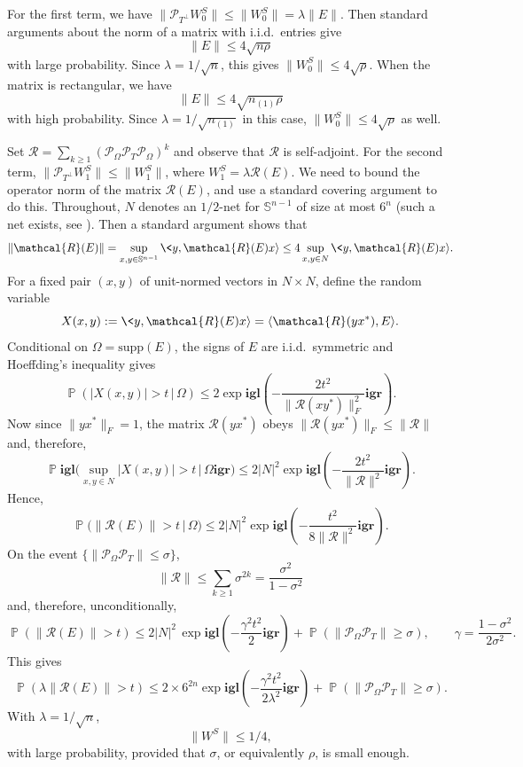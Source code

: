 For the first term, we have $\|\mathcal{P}_{T^\perp} W_0^S\| \le \|W_0^S\| = \lambda
\|E\|$. Then standard arguments about the norm of a matrix with i.i.d.~entries give \cite{Vershynin280}
\[
\|E\| \le 4\sqrt{n \rho}
\]
with large probability.  Since $\lambda = 1/\sqrt{n}$, this gives
$\|W_0^S\| \le 4 \sqrt{\rho}$. When the matrix is rectangular, we have 
\[
\|E\| \le 4\sqrt{n_{(1)} \rho}
\]
with high probability. Since $\lambda = 1/\sqrt{n_{(1)}}$ in this case, $\|W_0^S\| \le 4 \sqrt{\rho}$ as well.

Set $\mathcal{R} = \sum_{k \ge 1} (\mathcal{P}_{\Omega}\mathcal{P}_T\mathcal{P}_{\Omega})^{k}$ and observe that
$\mathcal{R}$ is self-adjoint. For the second term, $\|\mathcal{P}_{T^\perp} W_1^S\|
\le \|W_1^S\|$, where $W_1^S = \lambda \mathcal{R} (E)$.  We need to bound the operator norm of the matrix $\mathcal{R}(E)$, and use a standard covering argument to do this. Throughout, $N$ denotes an $1/2$-net for $\mathbb{S}^{n-1}$ of size at most $6^n$ (such a net exists, see \cite[Theorem 4.16]{Ledoux}). Then a standard argument \cite{Vershynin280} shows that
\[
\|\mathcal{R}(E)\| = \sup_{x, y \in \mathbb{S}^{n-1}} \<y,
\mathcal{R}(E) x\rangle \le 4 \sup_{x,y \in N} \<y, \mathcal{R}(E) x\rangle.
\]
For a fixed pair $(x,y)$ of unit-normed vectors in $N \times N$, define the random variable
\[
X(x,y) := \<y, \mathcal{R} (E) x\rangle = \langle\mathcal{R}(yx^*), E\rangle. 
\]
Conditional on $\Omega = \text{supp}(E)$, the signs of $E$ are i.i.d.~symmetric and Hoeffding's inequality gives
\[
\operatorname{\mathbb{P}}(|X(x,y)| > t \, | \, \Omega) \le 2 \exp\mathbf{igl}(-\frac{2t^2}{
  \|\mathcal{R}(xy^*)\|_F^2}\mathbf{igr}).
\]
Now since $\|yx^*\|_F = 1$, the matrix $\mathcal{R}(yx^*)$ obeys $
\|\mathcal{R}(yx^*)\|_F \le \|\mathcal{R}\|$ and, therefore,
\[
\operatorname{\mathbb{P}}\mathbf{igl}(\sup_{x,y \in N} |X(x,y)| > t \, | \, \Omega\mathbf{igr}) \le 2|N|^2 
\exp\mathbf{igl}(-\frac{2t^2}{\|\mathcal{R}\|^2}\mathbf{igr}).
\]
Hence, 
\[
\operatorname{\mathbb{P}}(\|\mathcal{R}(E)\| > t \, | \, \Omega) \le 2|N|^2
\exp\mathbf{igl}(-\frac{t^2}{8 \|\mathcal{R}\|^2}\mathbf{igr}). 
\]
On the event $\{\|\mathcal{P}_{\Omega}\mathcal{P}_T\| \le \sigma\}$,
\[
\|\mathcal{R}\| \le \sum_{k \ge 1} \sigma^{2k} =
\frac{\sigma^2}{1-\sigma^2}
\]
and, therefore, unconditionally,
\[
\operatorname{\mathbb{P}}(\|\mathcal{R}(E)\| > t) \le 2 |N|^2 \, \exp\mathbf{igl}(- \frac{\gamma^2
  t^2}{2}\mathbf{igr}) + \operatorname{\mathbb{P}}(\|\mathcal{P}_{\Omega}\mathcal{P}_T\| \ge \sigma), \qquad \gamma =
\frac{1-\sigma^2}{2\sigma^2}.
\]
This gives 
\[
\operatorname{\mathbb{P}}(\lambda \|\mathcal{R}(E)\| > t) \le 2 \times 6^{2n} \exp\mathbf{igl}(-
\frac{\gamma^2 t^2}{2\lambda^2}\mathbf{igr}) + \operatorname{\mathbb{P}}(\|\mathcal{P}_{\Omega}\mathcal{P}_T\| \ge \sigma).
\]
With $\lambda = 1/\sqrt{n}$,
\[
\|W^S\| \le 1/4,
\]
with large probability, provided that $\sigma$, or equivalently
$\rho$, is small enough.

